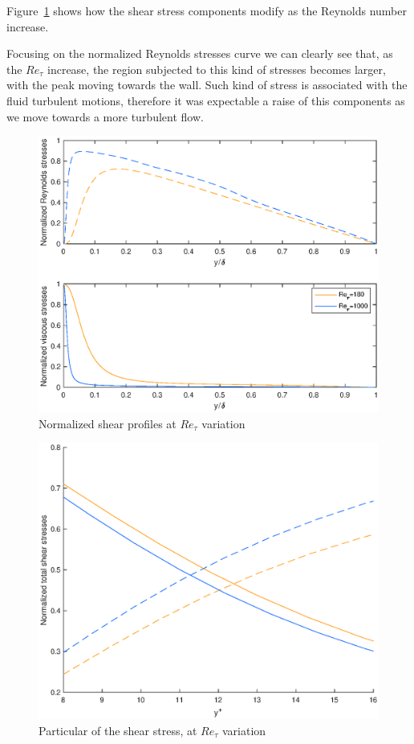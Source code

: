 Figure~\ref{shear:comparison} shows how the shear stress components modify as the Reynolds number increase. \par
Focusing on the normalized Reynolds stresses curve we can clearly see that, as the $Re_{\tau}$ increase, the region subjected to this kind of stresses becomes larger, with the peak moving towards the wall. Such kind of stress is associated with the fluid turbulent motions, therefore it was expectable a raise of this components as we move towards a more turbulent flow. \par

\begin{figure}
\begin{center}
\includegraphics[scale=0.55]{grafici/shear_comparison.eps}
\caption{Normalized shear profiles at $Re_{\tau}$ variation}
\label{shear:comparison}
\end{center}
\end{figure}

\begin{figure}
\begin{center}
\includegraphics[scale=0.55]{grafici/y12.eps}
\caption{Particular of the shear stress, at $Re_{\tau}$ variation}
\label{y12}
\end{center}
\end{figure}

